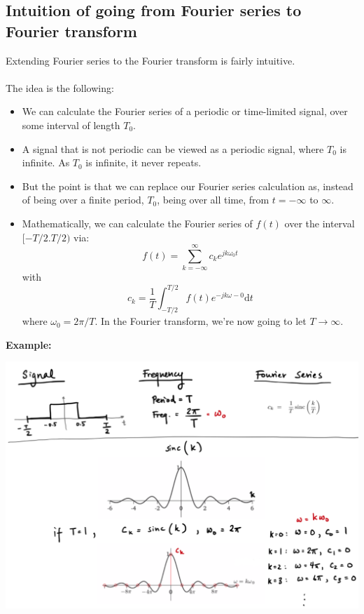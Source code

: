 \documentclass[10pt]{article}
\newcommand{\example}{\textbf{Example: }}
\begin{document}
\subsection*{Intuition of going from Fourier series to Fourier transform}
Extending Fourier series to the Fourier transform is fairly intuitive.\\\\
The idea is the following:
\begin{itemize}
    \item We can calculate the Fourier series of a periodic or time-limited signal, over some interval of length $T_0$.
    \item A signal that is not periodic can be viewed as a periodic signal, where $T_0$ is infinite.  As $T_0$ is infinite, it never repeats.
    \item But the point is that we can replace our Fourier series calculation as, instead of being over a finite period, $T_0$, being over all time, from $t = -\infty$ to $\infty$.
    \item Mathematically, we can calculate the Fourier series of $f(t)$ over the interval $[-T/2. T/2)$ via:
    \[f(t) = \sum_{k = -\infty}^\infty c_k e^{jk\omega_0 t}\]
    with 
    \[c_k = \frac{1}{T} \int_{-T/2}^{T/2} f(t) e^{-jk\omega-0}\text{d}t\]
    where $\omega_0 = 2\pi/T$.  In the Fourier transform, we're now going to let $T \rightarrow \infty$.
\end{itemize}
\example\\
\begin{center}
    \includegraphics[scale=0.65]{W5_1.png}
\end{center}
\end{document}
